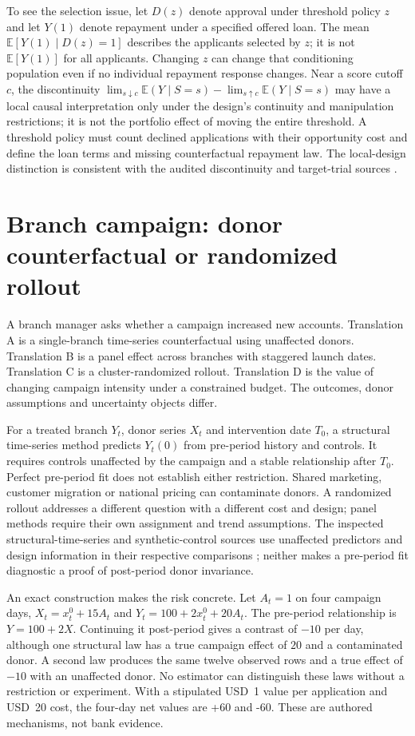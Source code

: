 To see the selection issue, let $D(z)$ denote approval under threshold policy $z$ and let $Y(1)$ denote repayment under a specified offered loan. The mean $\mathbb E[Y(1)\mid D(z)=1]$ describes the applicants selected by $z$; it is not $\mathbb E[Y(1)]$ for all applicants. Changing $z$ can change that conditioning population even if no individual repayment response changes. Near a score cutoff $c$, the discontinuity $\lim_{s\downarrow c}\mathbb E(Y\mid S=s)-\lim_{s\uparrow c}\mathbb E(Y\mid S=s)$ may have a local causal interpretation only under the design's continuity and manipulation restrictions; it is not the portfolio effect of moving the entire threshold. A threshold policy must count declined applications with their opportunity cost and define the loan terms and missing counterfactual repayment law. The local-design distinction is consistent with the audited discontinuity and target-trial sources \citep{hernan2020}.

\section{Branch campaign: donor counterfactual or randomized rollout}

A branch manager asks whether a campaign increased new accounts. Translation A is a single-branch time-series counterfactual using unaffected donors. Translation B is a panel effect across branches with staggered launch dates. Translation C is a cluster-randomized rollout. Translation D is the value of changing campaign intensity under a constrained budget. The outcomes, donor assumptions and uncertainty objects differ.

For a treated branch $Y_t$, donor series $X_t$ and intervention date $T_0$, a structural time-series method predicts $Y_t(0)$ from pre-period history and controls. It requires controls unaffected by the campaign and a stable relationship after $T_0$. Perfect pre-period fit does not establish either restriction. Shared marketing, customer migration or national pricing can contaminate donors. A randomized rollout addresses a different question with a different cost and design; panel methods require their own assignment and trend assumptions.
The inspected structural-time-series and synthetic-control sources use unaffected predictors and design information in their respective comparisons \citep{exec13_ci_brodersen2015,abadie2010}; neither makes a pre-period fit diagnostic a proof of post-period donor invariance.

An exact construction makes the risk concrete. Let $A_t=1$ on four campaign days, $X_t=x_t^0+15A_t$ and $Y_t=100+2x_t^0+20A_t$. The pre-period relationship is $Y=100+2X$. Continuing it post-period gives a contrast of $-10$ per day, although one structural law has a true campaign effect of $20$ and a contaminated donor. A second law produces the same twelve observed rows and a true effect of $-10$ with an unaffected donor. No estimator can distinguish these laws without a restriction or experiment. With a stipulated USD~1 value per application and USD~20 cost, the four-day net values are +60 and -60. These are authored mechanisms, not bank evidence.

